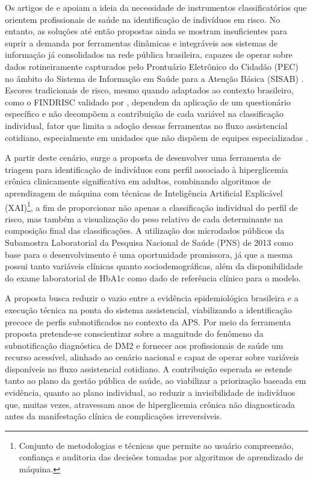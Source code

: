 Os artigos de \textcite{moreira2024predicting} e \textcite{bracco2026brdmrisc} apoiam a ideia da necessidade de instrumentos classificatórios que orientem profissionais de saúde na identificação de indivíduos em risco. No entanto, as soluções até então propostas ainda se mostram insuficientes para suprir a demanda por ferramentas dinâmicas e integráveis aos sistemas de informação já consolidados na rede pública brasileira, capazes de operar sobre dados rotineiramente capturados pelo Prontuário Eletrônico do Cidadão (PEC) no âmbito do Sistema de Informação em Saúde para a Atenção Básica (SISAB) \cite{brasil_esus_aps}. Escores tradicionais de risco, mesmo quando adaptados ao contexto brasileiro, como o FINDRISC validado por \textcite{conceiccao2020translation}, dependem da aplicação de um questionário específico e não decompõem a contribuição de cada variável na classificação individual, fator que limita a adoção dessas ferramentas no fluxo assistencial cotidiano, especialmente em unidades que não dispõem de equipes especializadas \cite{da2025uso}.

A partir deste cenário, surge a proposta de desenvolver uma ferramenta de triagem para identificação de indivíduos com perfil associado à hiperglicemia crônica clinicamente significativa em adultos, combinando algoritmos de aprendizagem de máquina com técnicas de Inteligência Artificial Explicável (XAI)\footnote{Conjunto de metodologias e técnicas que permite ao usuário compreensão, confiança e auditoria das decisões tomadas por algoritmos de aprendizado de máquina.}, a fim de proporcionar não apenas a classificação individual do perfil de risco, mas também a visualização do peso relativo de cada determinante na composição final das classificações. A utilização dos microdados públicos da Subamostra Laboratorial da Pesquisa Nacional de Saúde (PNS) de 2013 como base para o desenvolvimento é uma oportunidade promissora, já que a mesma possui tanto variáveis clínicas quanto sociodemográficas, além da disponibilidade do exame laboratorial de HbA1c como dado de referência clínico para o modelo.

A proposta busca reduzir o vazio entre a evidência epidemiológica brasileira e a execução técnica na ponta do sistema assistencial, viabilizando a identificação precoce de perfis subnotificados no contexto da APS. Por meio da ferramenta proposta pretende-se conscientizar sobre a magnitude do fenômeno da subnotificação diagnóstica de DM2 e fornecer aos profissionais de saúde um recurso acessível, alinhado ao cenário nacional e capaz de operar sobre variáveis disponíveis no fluxo assistencial cotidiano. A contribuição esperada se estende tanto ao plano da gestão pública de saúde, ao viabilizar a priorização baseada em evidência, quanto ao plano individual, ao reduzir a invisibilidade de indivíduos que, muitas vezes, atravessam anos de hiperglicemia crônica não diagnosticada antes da manifestação clínica de complicações irreversíveis.

